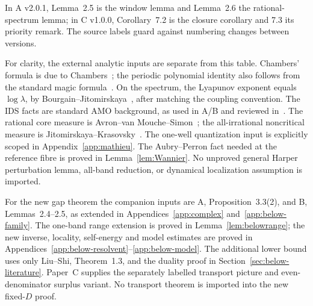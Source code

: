 In A v2.0.1, Lemma~2.5 is the window lemma and Lemma~2.6 the rational-spectrum lemma; in C v1.0.0, Corollary~7.2 is the closure corollary and 7.3 its priority remark. The source labels guard against numbering changes between versions.

For clarity, the external analytic inputs are separate from this table. Chambers' formula is due to Chambers~\cite{Chambers1965}; the periodic polynomial identity also follows from the standard magic formula~\cite[Theorem~3.1]{DKS2010}. On the spectrum, the Lyapunov exponent equals $\log\lambda$, by Bourgain--Jitomirskaya~\cite[Corollary~2]{BourgainJitomirskaya2002}, after matching the coupling convention. The IDS facts are standard AMO background, as used in A/B and reviewed in~\cite{AYZdry}. The rational core measure is Avron--van Mouche--Simon~\cite{AvMS}; the all-irrational noncritical measure is Jitomirskaya--Krasovsky~\cite{JKmeasure}. The one-well quantization input is explicitly scoped in Appendix~\ref{app:mathieu}. The Aubry--Perron fact needed at the reference fibre is proved in Lemma~\ref{lem:Wannier}. No unproved general Harper perturbation lemma, all-band reduction, or dynamical localization assumption is imported.

For the new gap theorem the companion inputs are A, Proposition~3.3(2), and B, Lemmas~2.4--2.5, as extended in Appendices~\ref{app:complex} and~\ref{app:below-family}. The one-band range extension is proved in Lemma~\ref{lem:belowrange}; the new inverse, locality, self-energy and model estimates are proved in Appendices~\ref{app:below-resolvent}--\ref{app:below-model}. The additional lower bound uses only Liu--Shi, Theorem~1.3, and the duality proof in Section~\ref{sec:below-literature}. Paper~C supplies the separately labelled transport picture and even-denominator surplus variant. No transport theorem is imported into the new fixed-$D$ proof.

\label{end:companions}
